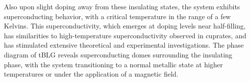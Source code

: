


Also upon slight doping away from these insulating states, the system exhibits superconducting behavior, with a critical temperature in the range of a few Kelvins. This superconductivity, which emerges at doping levels near half-filling, has similarities to high-temperature superconductivity observed in cuprates, and has stimulated extensive theoretical and experimental investigations. The phase diagram of tBLG reveals superconducting domes surrounding the insulating phase, with the system transitioning to a normal metallic state at higher temperatures or under the application of a magnetic field.

